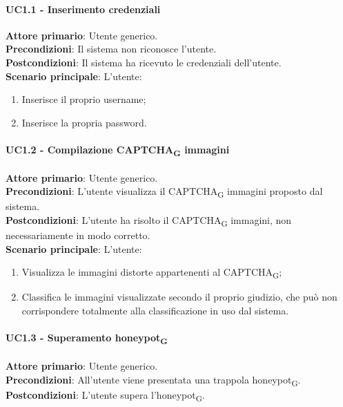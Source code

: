 \paragraph{UC1.1 - Inserimento credenziali}
\textbf{Attore primario}: Utente generico.\\
\textbf{Precondizioni}: Il sistema non riconosce l'utente.\\
\textbf{Postcondizioni}: Il sistema ha ricevuto le credenziali dell'utente.\\

\textbf{Scenario principale}: L'utente:
\begin{enumerate}
   \item Inserisce il proprio username;
   \item Inserisce la propria password.
\end{enumerate}

\paragraph{UC1.2 - Compilazione CAPTCHA\textsubscript{G} immagini}
\textbf{Attore primario}: Utente generico.\\
\textbf{Precondizioni}: L'utente visualizza il CAPTCHA\textsubscript{G} immagini proposto dal sistema.\\
\textbf{Postcondizioni}: L'utente ha risolto il CAPTCHA\textsubscript{G} immagini, non necessariamente in modo corretto.\\

\textbf{Scenario principale}: L'utente:
\begin{enumerate}
   \item Visualizza le immagini distorte appartenenti al CAPTCHA\textsubscript{G};
   \item Classifica le immagini visualizzate secondo il proprio giudizio, che può non corrispondere totalmente alla classificazione in uso dal sistema.
\end{enumerate}

\paragraph{UC1.3 - Superamento honeypot\textsubscript{G}}
\textbf{Attore primario}: Utente generico.\\
\textbf{Precondizioni}: All'utente viene presentata una trappola honeypot\textsubscript{G}.\\
\textbf{Postcondizioni}: L'utente supera l'honeypot\textsubscript{G}.\\

